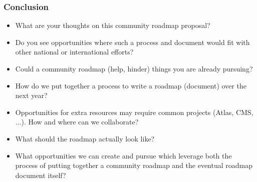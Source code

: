 \begin{frame}
\frametitle{Conclusion}

\begin{itemize}
\item What are your thoughts on this community roadmap proposal?
\item Do you see opportunities where such a process and document would fit with other national or international efforts?
\item Could a community roadmap (help, hinder) things you are already pursuing?
\item How do we put together a process to write a roadmap (document) over the next year?
\item Opportunities for extra resources may require common projects (Atlas, CMS, ...). How and where can we collaborate?
\item What should the roadmap actually look like?
\item What opportunities we can create and pursue which leverage both the process of putting together a community roadmap and the eventual roadmap document itself?
\end{itemize}



\end{frame}


